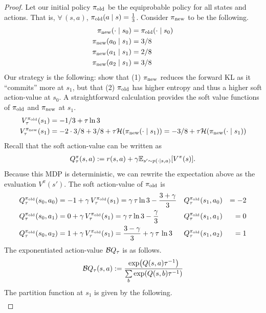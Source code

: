 \documentclass[\main/thesis.tex]{subfiles}
\begin{document}
\begin{proof}
Let our initial policy ${\pi_\mathrm{old}}$ be the equiprobable policy for all states and actions. That is, $\forall\, (s, a)$, ${\pi_\mathrm{old}}(a \mid s) = \frac{1}{3}$. Consider ${\pi_\mathrm{new}}$ to be the following. 
\begin{align*}
    {\pi_\mathrm{new}}(\cdot \mid s_0) &= {\pi_\mathrm{old}}(\cdot \mid s_0)\\
    {\pi_\mathrm{new}}(a_0 \mid s_1) &= 3/8 \\
    {\pi_\mathrm{new}}(a_1 \mid s_1) &= 2/8\\
    {\pi_\mathrm{new}}(a_2 \mid s_1) &= 3/8
\end{align*}
%
Our strategy is the following: show that (1) ${\pi_\mathrm{new}}$ reduces the forward KL as it ``commits'' more at $s_1$, but that (2) ${\pi_\mathrm{old}}$ has higher entropy and thus a higher soft action-value at $s_0$. A straightforward calculation provides the soft value functions of ${\pi_\mathrm{old}}$ and ${\pi_\mathrm{new}}$ at $s_1$.
\begin{align*}
    V_\tau^{\pi_\mathrm{old}}(s_1) &= -1/3  + \tau \ln 3    \\
    V_\tau^{\pi_\mathrm{new}}(s_1) &= -2 \cdot 3/8 + 3/8 + \tau \mathcal{H}({\pi_\mathrm{new}}(\cdot \mid s_1)) = -3/8 + \tau\mathcal{H}({\pi_\mathrm{new}}(\cdot \mid s_1))
\end{align*}
Recall that the soft action-value can be written as 
\begin{align*}
    Q_\tau^\pi(s, a) := r(s, a) + \gamma \mathbb{E}_{s'\sim p(\cdot \mid s, a)}[V^\pi(s)]. 
\end{align*}
Because this MDP is deterministic, we can rewrite the expectation above as the evaluation $V^\pi(s')$. The soft action-value of ${\pi_\mathrm{old}}$ is 
\begin{align*}
    Q_\tau^{\pi_\mathrm{old}}(s_0, a_0) &= -1 + \gamma \, V_\tau^{\pi_\mathrm{old}}(s_1) = \gamma \,\tau \ln 3 - \frac{3 + \gamma}{3}  && Q_\tau^{\pi_\mathrm{old}}(s_1, a_0) &= -2 \\
    Q_\tau^{\pi_\mathrm{old}}(s_0, a_1) &= 0 +  \gamma\, V_\tau^{\pi_\mathrm{old}}(s_1) = \gamma \,\tau\ln3 - \frac{\gamma}{3} && Q_\tau^{\pi_\mathrm{old}}(s_1, a_1) &= 0 \\
    Q_\tau^{\pi_\mathrm{old}}(s_0, a_2) &= 1 + \gamma\, V_\tau^{\pi_\mathrm{old}}(s_1) = \frac{3 - \gamma}{3} + \gamma \,\tau\, \ln3 && Q_\tau^{\pi_\mathrm{old}}(s_1, a_2) &= 1  
\end{align*}
%
The exponentiated action-value $\mathcal{B}Q_\tau$ is as follows.
\begin{align*}
    \mathcal{B}Q_\tau(s, a) := \frac{\exp(Q(s, a) \tau^{-1})}{\sum\limits_b \exp(Q(s, b) \tau^{-1})}
\end{align*}
%
The partition function at $s_1$ is given by the following.
\begin{align*}

\end{align*}
\end{proof}
\end{document}
